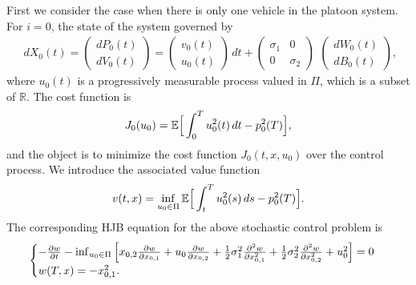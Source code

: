 \documentclass{article}
\begin{document}
First we consider the case when there is only one vehicle in the platoon system. For $i = 0$, the state of the system governed by
\begin{equation} \label{node danamic, N = 0}
\begin{array}{c}
d  X_{0}(t) =
  \left(   \begin{array}{c}
    d  P_{0}(t) \\
    d  V_{0}(t)
  \end{array}   \right)  = 
\left(    \begin{array}{c}
    v_{0}(t) \\
    u_{0}(t)
  \end{array}   \right) \, d t + 
\left(   \begin{array}{cc}
    \sigma_{1} &  0 \\
    0 & \sigma_{2}
  \end{array}   \right)
\end{array}
\left(    \begin{array}{c}
   d W_{0}(t) \\
   d B_{0}(t)
  \end{array}   \right),
\end{equation}
where $u_{0}(t)$ is a progressively measurable process valued in $\Pi$, which is a subset of $\mathbb{R}$. The cost function is
\begin{equation}
    J_{0} (u_{0}) = \mathbb{E} \Big{[} \int_{0}^{T} u_{0}^{2}(t) \, d t - p_{0}^{2}(T) \Big{]},
\end{equation}
and the object is to minimize the cost function $J_{0} (t, x, u_{0})$ over the control process. We introduce the associated value function
\begin{equation*}
    v(t, x) = \inf_{u_{0} \in \Pi} \mathbb{E} \Big{[} \int_{t}^{T} u_{0}^{2}(s) \, d s - p_{0}^{2}(T) \Big{]}.
\end{equation*}
The corresponding HJB equation for the above stochastic control problem is 
\begin{equation} \label{HJB, N=0}
    \begin{cases}
   - \frac{\partial w}{\partial t} - \inf_{u_{0} \in \Pi} \Big{[} x_{0,2} \frac{\partial w}{\partial x_{0, 1}} + u_{0} \frac{\partial w}{\partial x_{0, 2}} + \frac{1}{2} \sigma_{1}^{2} \frac{\partial^{2} w}{\partial x_{0, 1}^{2}} + \frac{1}{2} \sigma_{2}^{2} \frac{\partial^{2} w}{\partial x_{0, 2}^{2}} + u_{0}^{2} \Big{]}   = 0  \\
   w(T, x) = - x_{0, 1}^{2}.
   \end{cases}
\end{equation}
\end{document}
